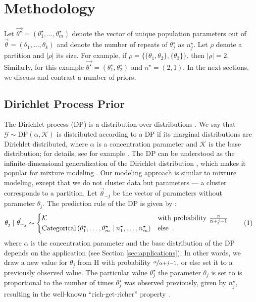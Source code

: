 \documentclass[11pt,a4paper]{article}
\theoremstyle{definition} %
\theoremstyle{case}
\newcommand{\numberthis}{\addtocounter{equation}{1}\tag{\theequation}}
\begin{document}
\section{Methodology} \label{sec:methodology}
Let $\vec{\theta^{\star}} = (\theta^{\star}_1, \ldots, \theta^{\star}_m)$ denote the vector of unique population parameters out of $\vec{\theta} = (\theta_1, \ldots, \theta_k)$ and denote the number of repeats of $\theta^{\star}_j$ as $n^{\star}_j$. Let $\rho$ denote a partition and $|\rho|$ its size. For example, if $\rho = \{\{\theta_1, \theta_2\}, \{\theta_3\}\}$, then $|\rho| = 2$. Similarly, for this example $\vec{\theta^{\star}} = (\theta^{\star}_1, \theta^{\star}_2)$ and $n^{\star} = (2, 1)$. In the next sections, we discuss and contrast a number of priors.

\subsection{Dirichlet Process Prior}
The Dirichlet process (DP) is a distribution over distributions \parencite{ferguson1973bayesian}. We say that $\mathcal{G} \sim \text{DP}(\alpha, \mathcal{K})$ is distributed according to a DP if its marginal distributions are Dirichlet distributed, where $\alpha$ is a concentration parameter and $\mathcal{K}$ is the base distribution; for details, see for example \textcite{teh2010dirichlet}. The DP can be understood as the infinite-dimensional generalization of the Dirichlet distribution \parencite[e.g.,][]{teh2010dirichlet}, which makes it popular for mixture modeling \parencite[e.g.,][]{rasmussen1999infinite}. Our modeling approach is similar to mixture modeling, except that we do not cluster data but parameters --- a cluster corresponds to a partition. Let $\vec{\theta}_{-j}$ be the vector of parameters without parameter $\theta_j$. The prediction rule of the DP is given by \parencite[e.g.,][]{ishwaran2001gibbs, blackwell1973ferguson}:
\begin{equation}
    \theta_j \mid \vec{\theta}_{-j} \sim \begin{cases}
    \mathcal{K} & \text{with probability } \frac{\alpha}{\alpha + j - 1} \\
    \text{Categorical}\left(\theta_1^{\star}, \ldots, \theta_m^{\star} \mid n^{\star}_1, \ldots, n^{\star}_m\right) & \text{else} \enspace ,
    \end{cases} \numberthis
\end{equation}
where $\alpha$ is the concentration parameter and the base distribution of the DP depends on the application (see Section \ref{sec:applications}). In other words, we draw a new value for $\theta_j$ from H with probability $\nicefrac{\alpha}{\alpha + j - 1}$, or else set it to a previously observed value. The particular value $\theta^{\star}_j$ the parameter $\theta_j$ is set to is proportional to the number of times $\theta^{\star}_j$ was observed previously, given by $n^{\star}_j$, resulting in the well-known ``rich-get-richer'' property \parencite[e.g.,][]{teh2010dirichlet}.
\end{document}
